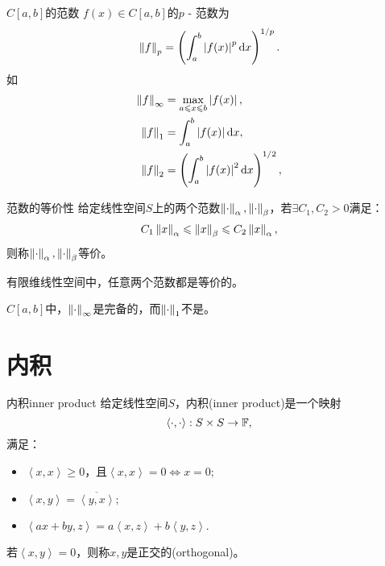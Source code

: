 \begin{example}
    {$C[a,b]$的范数}{}
    $f(x)\in C[a,b]$的$p$ - 范数为
    \[
        \left\lVert f\right\rVert_p=\left(\int_a^b\left\lvert f(x)\right\rvert^p\mathop{}\!\mathrm{d} x\right)^{1/p}.
    \]
    如
    \begin{subequations}
        \begin{align}
            \left\lVert f\right\rVert_\infty&=\max_{a\leqslant x\leqslant b}\left\lvert f(x)\right\rvert,\\
            \left\lVert f\right\rVert_1&=\int_a^b\left\lvert f(x)\right\rvert\mathop{}\!\mathrm{d} x,\\
            \left\lVert f\right\rVert_2&=\left(\int_a^b\left\lvert f(x)\right\rvert^2\mathop{}\!\mathrm{d} x\right)^{1/2},
        \end{align}
    \end{subequations}
\end{example}

\begin{definition}
    {范数的等价性}{}
    给定线性空间$S$上的两个范数$\left\lVert\cdot\right\rVert_\alpha,\left\lVert\cdot\right\rVert_\beta$，若$\exists C_1,C_2>0$满足：
    \[
        C_1\left\lVert x\right\rVert_\alpha\leqslant\left\lVert x\right\rVert_\beta\leqslant C_2\left\lVert x\right\rVert_\alpha,
    \]
    则称$\left\lVert\cdot\right\rVert_\alpha,\left\lVert\cdot\right\rVert_\beta$等价。
\end{definition}

\begin{theorem}
    {}{}
    有限维线性空间中，任意两个范数都是等价的。
\end{theorem}

$C[a,b]$中，$\left\lVert\cdot\right\rVert_\infty$是完备的，而$\left\lVert\cdot\right\rVert_1$不是。

\section{内积}
\label{sec:inner product}

\newcommand{\inp}[2]{\left\langle #1,#2\right\rangle}  %


\begin{definition}
    {内积}{inner product}
    给定线性空间$S$，内积(inner product)是一个映射
    \begin{equation}
        \inp\cdot\cdot:S\times S\to\FF,
    \end{equation}
    满足：
    \begin{itemize}
        \item $\inp xx\geq 0$，且$\inp xx=0\iff x=0;$
        \item $\inp xy=\overline{\inp yx};$
        \item $\inp{ax+by}z=a\inp xz+b\inp yz.$
    \end{itemize}
    若$\inp xy=0$，则称$x,y$是正交的(orthogonal)。
\end{definition}

